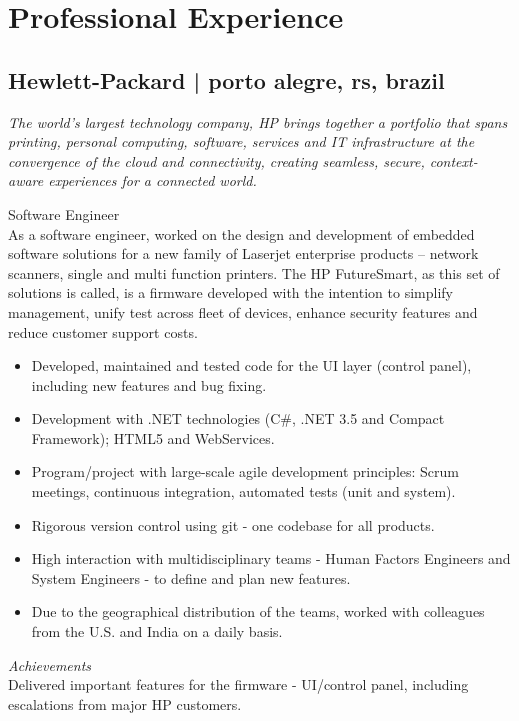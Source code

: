 \documentclass[10pt,a4paper]{article}
\newcommand{\years}[1]{\marginnote{{\small #1}}}
\begin{document}
{%
\section{Professional Experience}

\subsection{Hewlett-Packard | {\footnotesize{porto alegre, rs, brazil}}}
{\footnotesize\textit{The world’s largest technology company, HP brings together a portfolio that spans printing, personal computing, software, services and IT infrastructure at the convergence of the cloud and connectivity, creating seamless, secure, context-aware experiences for a connected world.}}
\medskip

\years{Jul 2010 -\\Feb 2012}Software Engineer\\
As a software engineer, worked on the design and development of embedded software solutions for a new family of Laserjet enterprise products – network scanners, single and multi function printers. The HP FutureSmart, as this set of solutions is called, is a firmware developed with the intention to simplify management, unify test across fleet of devices, enhance security features and reduce customer support costs.
\begin{itemize}
  \item Developed, maintained and tested code for the UI layer (control panel), including new features and bug fixing.
  \item Development with .NET technologies (C\#, .NET 3.5 and Compact Framework); HTML5 and WebServices.
  \item Program/project with large-scale agile development principles: Scrum meetings, continuous integration, automated tests (unit and system).
  \item Rigorous version control using git - one codebase for all products.
  \item High interaction with multidisciplinary teams - Human Factors Engineers and System Engineers - to define and plan new features.
  \item Due to the geographical distribution of the teams, worked with colleagues from the U.S. and India on a daily basis.
\end{itemize}
\emph{Achievements}\\
Delivered important features for the firmware - UI/control panel, including escalations from major HP customers.

}
\end{document}
